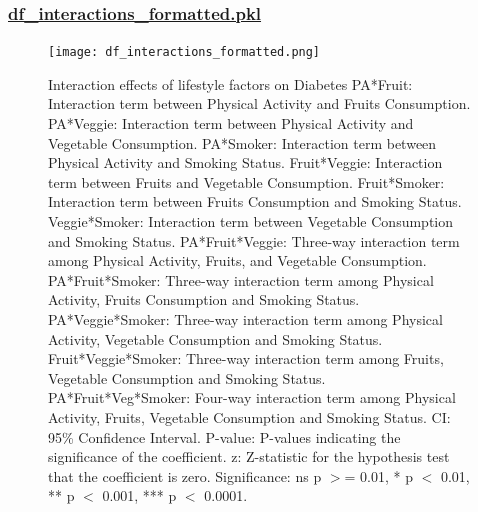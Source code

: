 \documentclass[11pt]{article}
\begin{document}
\subsubsection*{\hyperlink{file-df-interactions-pkl}{df\_interactions\_formatted.pkl}}

\begin{codeoutput}
\begin{figure}[htbp]
\centering
\texttt{[image: df\_interactions\_formatted.png]}
\caption{Interaction effects of lifestyle factors on Diabetes
PA*Fruit: Interaction term between Physical Activity and Fruits Consumption. 
PA*Veggie: Interaction term between Physical Activity and Vegetable Consumption. 
PA*Smoker: Interaction term between Physical Activity and Smoking Status. 
Fruit*Veggie: Interaction term between Fruits and Vegetable Consumption. 
Fruit*Smoker: Interaction term between Fruits Consumption and Smoking Status. 
Veggie*Smoker: Interaction term between Vegetable Consumption and Smoking Status. 
PA*Fruit*Veggie: Three-way interaction term among Physical Activity, Fruits, and Vegetable Consumption. 
PA*Fruit*Smoker: Three-way interaction term among Physical Activity, Fruits Consumption and Smoking Status. 
PA*Veggie*Smoker: Three-way interaction term among Physical Activity, Vegetable Consumption and Smoking Status. 
Fruit*Veggie*Smoker: Three-way interaction term among Fruits, Vegetable Consumption and Smoking Status. 
PA*Fruit*Veg*Smoker: Four-way interaction term among Physical Activity, Fruits, Vegetable Consumption and Smoking Status. 
CI: 95\% Confidence Interval. 
P-value: P-values indicating the significance of the coefficient. 
z: Z-statistic for the hypothesis test that the coefficient is zero. 
Significance: ns p $>$= 0.01, * p $<$ 0.01, ** p $<$ 0.001, *** p $<$ 0.0001.}
\label{figure:df-interactions-formatted}
\end{figure}
% 

\end{codeoutput}
\end{document}
